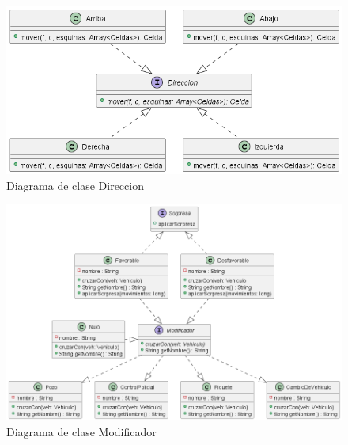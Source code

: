 \documentclass[titlepage,a4paper]{article}
\begin{document}
\begin{figure}[H]
  \centering
  \includegraphics[width=1\textwidth]{diagramas/interface-direccion.png}
  \caption{\label{fig:seq03} Diagrama de clase Direccion}
\end{figure}

\begin{figure}[H]
  \centering
  \includegraphics[width=1\textwidth]{diagramas/interface-modificador-sorpresa.png}
  \caption{\label{fig:seq04} Diagrama de clase Modificador}
\end{figure}
\end{document}
